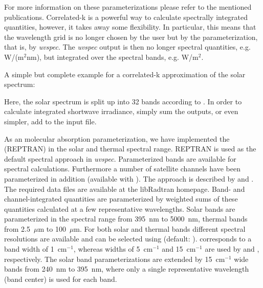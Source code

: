 For more information on these parameterizations please refer to the
mentioned publications. Correlated-k is a powerful way to calculate
spectrally integrated quantities, however, it takes away some
flexibility. In particular, this means that the wavelength grid is no
longer chosen by the user but by the parameterization, that is, by
{\sl uvspec}. The {\sl uvspec} output is then no longer spectral
quantities, e.g. W/(m$^2$nm), but integrated over the spectral bands,
e.g. W/m$^2$.

A simple but complete example for a correlated-k approximation of the
solar spectrum:


Here, the solar spectrum is split up into 32 bands according to
\citet{Kato1999b}.
In order to calculate integrated shortwave irradiance,
simply sum the outputs, or even simpler, add  to the
input file.

As an molecular absorption parameterization, we have implemented the 
 (REPTRAN) in the solar and thermal spectral range.
REPTRAN is used as the default spectral approach in {\sl uvspec}.
Parameterized bands are available for spectral calculations.
Furthermore a number of satellite channels have been parameterized in addition 
(available with ).
The approach is described by \citet{buehler2010} and \citet{gasteiger2014}.
The required data files are available at the libRadtran homepage.
Band- and channel-integrated quantities are parameterized by weighted sums of these quantities 
calculated at a few representative wavelengths.
Solar bands are parameterized in the spectral range from 395~nm to 5000~nm, thermal bands from 2.5~$\mu$m to 100~$\mu$m.
For both solar and thermal bands different spectral resolutions are available and can be selected using 
 (default: ).  corresponds to a band width of 1~cm$^{-1}$, 
whereas widths of 5~cm$^{-1}$ and 15~cm$^{-1}$ are used by  and , respectively.
The solar band parameterizations are extended by 15~cm$^{-1}$ wide bands from 240~nm to 395~nm, where only a single representative 
wavelength (band center) is used for each band.

